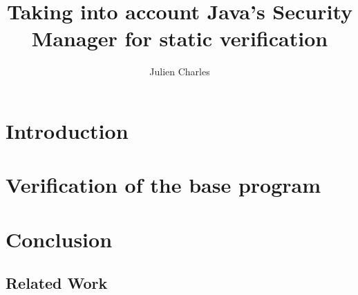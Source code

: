 \documentclass[draft]{llncs}
\begin{document}
\newcommand{\rarrow}{$\rightarrow$}
\newcommand{\conj}{$\wedge$}
\newcommand{\disjonc}{$\vee$}
\newcommand{\s}{\,}
\newcommand{\btab}{\begin{tt}\begin{tabbing}}
\newcommand{\etab}{\end{tabbing}\end{tt}}
\newcommand{\bcode}{\begin{tt}\begin{small}\begin{tabbing}}
\newcommand{\ecode}{\end{tabbing}\end{small}\end{tt}}
%
\frontmatter %
%

\mainmatter %
%
\title{Taking into account Java's Security Manager for static
verification}
%
%
\author{Julien Charles}
%
%
%

\maketitle %

\begin{abstract}

\end{abstract}
%
\section{Introduction}









%
\section{Verification of the base program}
\label{example}



\section{Conclusion}
\label{conclusion}
\subsection{Related Work}
\label{related}




%
%




%
\end{document}
